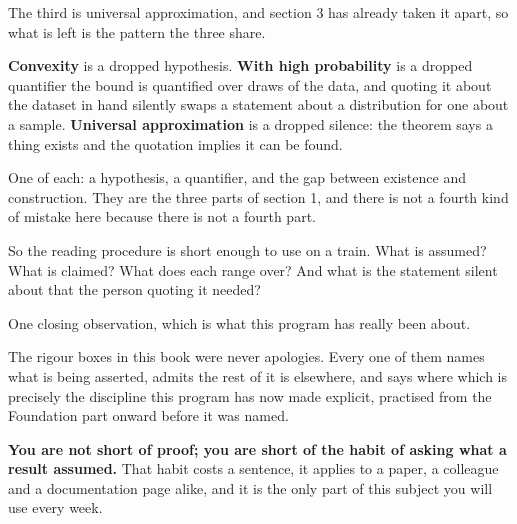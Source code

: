 \begin{fr}
The third is universal approximation, and section 3 has already taken it
apart, so what is left is the pattern the three share.

\begin{aibox}
\textbf{Convexity} is a dropped hypothesis. \textbf{With high probability} is
a dropped quantifier \dash{} the bound is quantified over draws of the data,
and quoting it about the dataset in hand silently swaps a statement about a
distribution for one about a sample. \textbf{Universal approximation} is a
dropped silence: the theorem says a thing exists and the quotation implies it
can be found.

One of each: a hypothesis, a quantifier, and the gap between existence and
construction. They are the three parts of section 1, and there is not a fourth
kind of mistake here because there is not a fourth part.
\end{aibox}

So the reading procedure is short enough to use on a train. What is assumed?
What is claimed? What does each range over? And what is the statement silent
about that the person quoting it needed?
\end{fr}

\begin{fr}
One closing observation, which is what this program has really been about.

The rigour boxes in this book were never apologies. Every one of them names
what is being asserted, admits the rest of it is elsewhere, and says where
\dash{} which is precisely the discipline this program has now made explicit,
practised from the Foundation part onward before it was named.

\textbf{You are not short of proof; you are short of the habit of asking what
a result assumed.} That habit costs a sentence, it applies to a paper, a
colleague and a documentation page alike, and it is the only part of this
subject you will use every week.
\end{fr}

